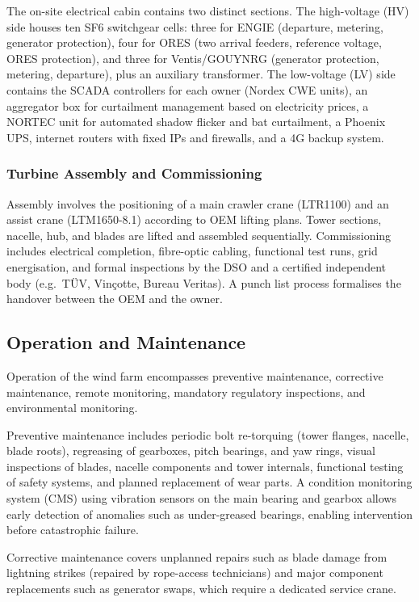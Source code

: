 The on-site electrical cabin contains two distinct sections. The high-voltage (HV) side
houses ten SF6 switchgear cells: three for ENGIE (departure, metering, generator protection),
four for ORES (two arrival feeders, reference voltage, ORES protection), and three for
Ventis/GOUYNRG (generator protection, metering, departure), plus an auxiliary transformer.
The low-voltage (LV) side contains the SCADA controllers for each owner (Nordex CWE units),
an aggregator box for curtailment management based on electricity prices, a NORTEC unit for
automated shadow flicker and bat curtailment, a Phoenix UPS, internet routers with fixed IPs
and firewalls, and a 4G backup system.

\subsubsection{Turbine Assembly and Commissioning}

Assembly involves the positioning of a main crawler crane (LTR1100) and an assist crane
(LTM1650-8.1) according to OEM lifting plans. Tower sections, nacelle, hub, and blades are
lifted and assembled sequentially. Commissioning includes electrical completion, fibre-optic
cabling, functional test runs, grid energisation, and formal inspections by the DSO and a
certified independent body (e.g.\ TÜV, Vinçotte, Bureau Veritas). A punch list process
formalises the handover between the OEM and the owner.

\subsection{Operation and Maintenance}

Operation of the wind farm encompasses preventive maintenance, corrective maintenance,
remote monitoring, mandatory regulatory inspections, and environmental monitoring.

Preventive maintenance includes periodic bolt re-torquing (tower flanges, nacelle, blade
roots), regreasing of gearboxes, pitch bearings, and yaw rings, visual inspections of blades,
nacelle components and tower internals, functional testing of safety systems, and planned
replacement of wear parts. A condition monitoring system (CMS) using vibration sensors on
the main bearing and gearbox allows early detection of anomalies such as under-greased
bearings, enabling intervention before catastrophic failure.

Corrective maintenance covers unplanned repairs such as blade damage from lightning strikes
(repaired by rope-access technicians) and major component replacements such as generator
swaps, which require a dedicated service crane.

